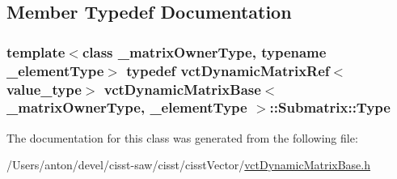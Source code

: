 \subsection{Member Typedef Documentation}
\hypertarget{classvct_dynamic_matrix_base_1_1_submatrix_a253f9d0900cce7df1b7ec9e3d5117623}{}
\subsubsection[{Type}]{\setlength{\rightskip}{0pt plus 5cm}template$<$class \+\_\+matrix\+Owner\+Type, typename \+\_\+element\+Type$>$ typedef {\bf vct\+Dynamic\+Matrix\+Ref}$<$value\+\_\+type$>$ {\bf vct\+Dynamic\+Matrix\+Base}$<$ \+\_\+matrix\+Owner\+Type, \+\_\+element\+Type $>$\+::{\bf Submatrix\+::\+Type}}\label{classvct_dynamic_matrix_base_1_1_submatrix_a253f9d0900cce7df1b7ec9e3d5117623}


The documentation for this class was generated from the following file\+:\begin{DoxyCompactItemize}
\item 
/\+Users/anton/devel/cisst-\/saw/cisst/cisst\+Vector/\hyperlink{vct_dynamic_matrix_base_8h}{vct\+Dynamic\+Matrix\+Base.\+h}\end{DoxyCompactItemize}

